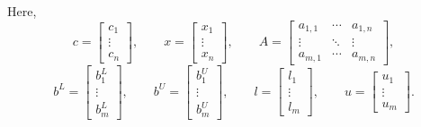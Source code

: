 Here,
\[
c =
\begin{bmatrix}
c_1\\
\vdots\\
c_n
\end{bmatrix},
\qquad
x =
\begin{bmatrix}
x_1\\
\vdots\\
x_n
\end{bmatrix},
\qquad
A =
\begin{bmatrix}
a_{1,1} & \cdots & a_{1,n}\\
\vdots & \ddots & \vdots\\
a_{m,1} & \cdots & a_{m,n}
\end{bmatrix},
\]
\[
b^L =
\begin{bmatrix}
b^L_1\\
\vdots\\
b^L_m
\end{bmatrix},
\qquad
b^U =
\begin{bmatrix}
b^U_1\\
\vdots\\
b^U_m
\end{bmatrix},
\qquad
l =
\begin{bmatrix}
l_1\\
\vdots\\
l_m
\end{bmatrix},
\qquad
u =
\begin{bmatrix}
u_1\\
\vdots\\
u_m
\end{bmatrix}.
\]